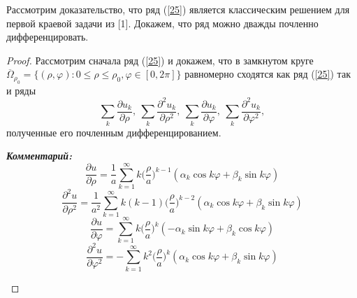 \documentclass[14pt, a4paper]{extarticle}
\let\oldref\ref
\renewcommand{\ref}[1]{(\oldref{#1})}
\begin{document}
   		  		Рассмотрим доказательство, что ряд \ref{25} является классическим решением для первой краевой задачи из [1].
   		  		\noindent Докажем, что ряд можно дважды почленно дифференцировать.
   		  		\begin{proof}Рассмотрим сначала ряд \ref{25}  и докажем, что  в замкнутом круге $\overline{\Omega}_{\rho_0} = \{ (\rho, \varphi) : 0 \leq \rho \leq \rho_0, \varphi \in [0, 2\pi] \}$ равномерно сходятся как ряд \ref{25} так и ряды
   		  		\begin{equation}
   		  			\sum_k \dfrac{\partial u_k}{\partial \rho}, \: \sum_k \dfrac{\partial^2 u_k}{\partial \rho^2}, \: \sum_k \dfrac{\partial u_k}{\partial \varphi}, \: \sum_k \dfrac{\partial^2 u_k}{\partial \varphi^2}, \label{27}
   		  		\end{equation}
   		  		полученные его почленным дифференцированием.
     		  	\begin{framed}
     		  		\textit{\textbf{Комментарий:}}
     		  		\begin{equation*}
     		  			\dfrac{\partial u}{\partial \rho} = \dfrac{1}{a} \sum_{k=1}^{\infty}  k \bigg( \dfrac{\rho}{a} \bigg)^{k-1} (\alpha_k \cos{k\varphi} + \beta_k \sin{k\varphi})
   		  			\end{equation*}
     		  		\begin{equation*}
   		  				\dfrac{\partial^2 u}{\partial \rho^2} = \dfrac{1}{a^2} \sum_{k=1}^{\infty}  k(k-1) \bigg( \dfrac{\rho}{a} \bigg)^{k-2} (\alpha_k \cos{k\varphi} + \beta_k \sin{k\varphi})
   		  			\end{equation*}
    		  		\begin{equation*}
		  				\dfrac{\partial u}{\partial \varphi} = \sum_{k=1}^{\infty}  k \bigg( \dfrac{\rho}{a} \bigg)^{k} (-\alpha_k \sin{k\varphi} + \beta_k \cos{k\varphi})
   		  			\end{equation*}
    		  		\begin{equation*}
   		  				\dfrac{\partial^2 u}{\partial \varphi^2} = -\sum_{k=1}^{\infty}  k^2 \bigg( \dfrac{\rho}{a} \bigg)^{k} (\alpha_k \cos{k\varphi} + \beta_k \sin{k\varphi})
   		  			\end{equation*}
   		  		\end{framed}
     		  	

\end{proof}
\end{document}

